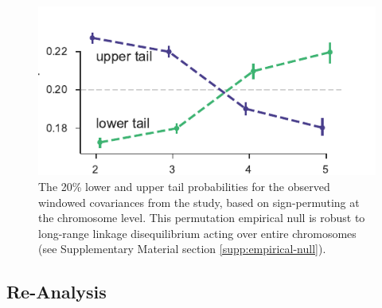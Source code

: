 \documentclass[11pt]{article}
\begin{document}
\begin{figure}[!ht]
  \centering

  \includegraphics[]{figures/barghi-tailprobs-seqid-20.pdf}

  \caption{The 20\% lower and upper tail probabilities for the observed
    windowed covariances from the \textcite{Barghi2019-qy} study, based on
    sign-permuting at the chromosome level. This permutation empirical null is
    robust to long-range linkage disequilibrium acting over entire chromosomes
  (see Supplementary Material section \ref{supp:empirical-null}).}
  
  \label{suppfig:barghi-tailprobs-seqid}
\end{figure}

\subsection{\textcite{Bergland2014-ij} Re-Analysis}
\label{supp:bergland-reanalysis}
\end{document}
